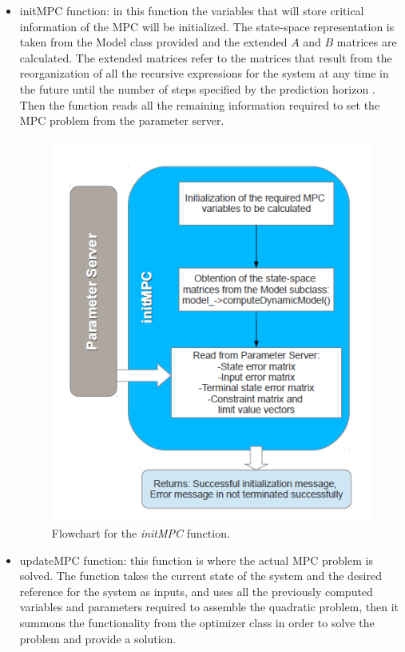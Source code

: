\begin{itemize}
\item initMPC function: in this function the variables that will store critical information of the MPC will be initialized. The state-space representation is taken from the Model class provided and the extended $A$ and $B$ matrices are calculated. The extended matrices refer to the matrices that result from the reorganization of all the recursive expressions for the system at any time in the future until the number of steps specified by the prediction horizon \cite{Ferreau2006}. Then the function reads all the remaining information required to set the MPC problem from the parameter server.

\begin{figure}[H]
\centering
\includegraphics[scale=0.8]{Images/Chapter4/initMPCflowchart.png}
\caption{Flowchart for the \emph{initMPC} function.}
\label{fig:initMPC_flowchart}
\end{figure}

\item updateMPC function: this function is where the actual MPC problem is solved. The function takes the current state of the system and the desired reference for the system as inputs, and uses all the previously computed variables and parameters required to assemble the quadratic problem, then it summons the functionality from the optimizer class in order to solve the problem and provide a solution. \\


\end{itemize}
